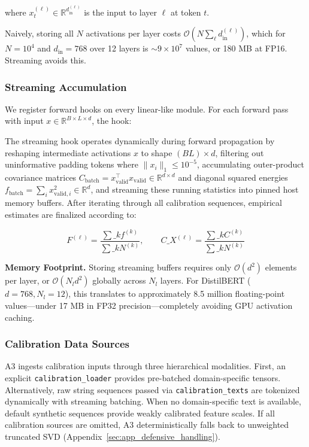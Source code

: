 where $x_t^{(\ell)} \in \mathbb{R}^{d_\text{in}^{(\ell)}}$ is the input to 
layer $\ell$ at token $t$.

Naively, storing all $N$ activations per layer costs $\mathcal{O}(N \sum_\ell d_\text{in}^{(\ell)})$, 
which for $N = 10^4$ and $d_\text{in} = 768$ over 12 layers is $\sim 9 \times 10^7$ 
values, or 180 MB at FP16. Streaming avoids this.

\subsubsection{Streaming Accumulation}

We register forward hooks on every linear-like module. For each forward pass 
with input $x \in \mathbb{R}^{B \times L \times d}$, the hook:

The streaming hook operates dynamically during forward propagation by reshaping intermediate activations $x$ to shape $(B L) \times d$, filtering out uninformative padding tokens where $\|x_i\|_1 \le 10^{-5}$, accumulating outer-product covariance matrices $C_\text{batch} = x_\text{valid}^\top x_\text{valid} \in \mathbb{R}^{d \times d}$ and diagonal squared energies $f_\text{batch} = \sum_i x_{\text{valid}, i}^2 \in \mathbb{R}^d$, and streaming these running statistics into pinned host memory buffers. After iterating through all calibration sequences, empirical estimates are finalized according to:

\[
F^{(\ell)} = \frac{\sum\_k f^{(k)}}{\sum\_k N^{(k)}}, \qquad
C\_X^{(\ell)} = \frac{\sum\_k C^{(k)}}{\sum\_k N^{(k)}}
\tag{4.2}
\]

\textbf{Memory Footprint.} Storing streaming buffers requires only $\mathcal{O}(d^2)$ elements per layer, or $\mathcal{O}(N_l d^2)$ globally across $N_l$ layers. For DistilBERT ($d = 768, N_l = 12$), this translates to approximately 8.5 million floating-point values—under 17 MB in FP32 precision—completely avoiding GPU activation caching.

\subsubsection{Calibration Data Sources}

A3 ingests calibration inputs through three hierarchical modalities. First, an explicit \texttt{calibration\_loader} provides pre-batched domain-specific tensors. Alternatively, raw string sequences passed via \texttt{calibration\_texts} are tokenized dynamically with streaming batching. When no domain-specific text is available, default synthetic sequences provide weakly calibrated feature scales. If all calibration sources are omitted, A3 deterministically falls back to unweighted truncated SVD (Appendix~\ref{sec:app_defensive_handling}).

